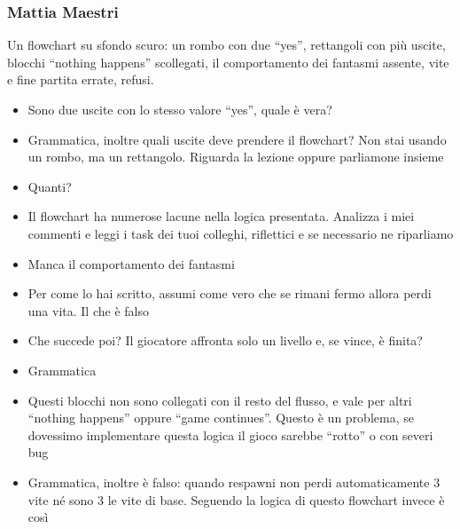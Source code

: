 \subsubsection{Mattia Maestri}
Un flowchart su sfondo scuro: un rombo con due ``yes'', rettangoli con più
uscite, blocchi ``nothing happens'' scollegati, il comportamento dei fantasmi
assente, vite e fine partita errate, refusi.
{\small
\begin{itemize}
  \item {} Sono due uscite con lo stesso valore ``yes'', quale è vera?
  \item {} Grammatica, inoltre quali uscite deve prendere il flowchart? Non stai usando un rombo, ma un rettangolo. Riguarda la lezione oppure parliamone insieme
  \item {} Quanti?
  \item Il flowchart ha numerose lacune nella logica presentata. Analizza i miei commenti e leggi i task dei tuoi colleghi, riflettici e se necessario ne riparliamo
  \item {} Manca il comportamento dei fantasmi
  \item {} Per come lo hai scritto, assumi come vero che se rimani fermo allora perdi una vita. Il che è falso
  \item {} Che succede poi? Il giocatore affronta solo un livello e, se vince, è finita?
  \item Grammatica
  \item {} Questi blocchi non sono collegati con il resto del flusso, e vale per altri ``nothing happens'' oppure ``game continues''. Questo è un problema, se dovessimo implementare questa logica il gioco sarebbe ``rotto'' o con severi bug
  \item {} Grammatica, inoltre è falso: quando respawni non perdi automaticamente 3 vite né sono 3 le vite di base. Seguendo la logica di questo flowchart invece è così
\end{itemize}
}

